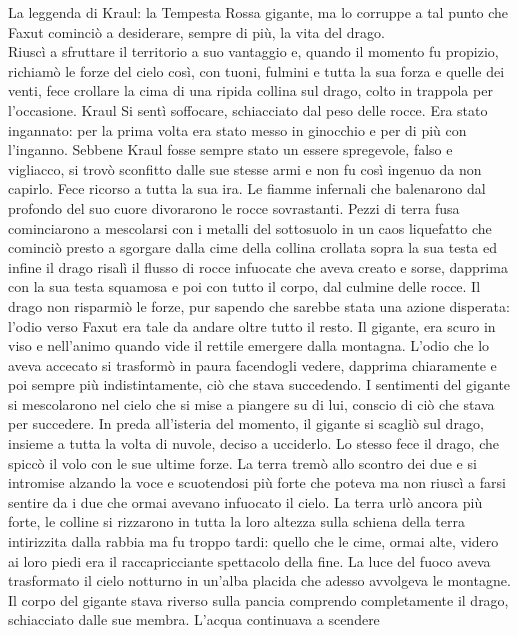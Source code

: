 \documentclass[10pt,twoside,twocolumn]{article}
\begin{document}
\begin{commentbox}{La leggenda di Kraul: la Tempesta Rossa}
  gigante, ma lo corruppe a tal punto che Faxut cominci\`o a desiderare,
  sempre di pi\`u, la vita del drago.\\
  Riusc\`i a sfruttare il territorio a suo vantaggio e, quando il momento fu propizio,
  richiam\`o le forze del cielo cos\`i, con tuoni, fulmini e tutta la sua forza e quelle dei venti,
  fece crollare la cima di una ripida collina sul drago, colto in trappola per l'occasione.
  Kraul Si sent\`i soffocare, schiacciato dal peso delle rocce. Era stato ingannato:
  per la prima volta era stato messo in ginocchio e per di pi\`u con l'inganno.
  Sebbene Kraul fosse sempre stato un essere spregevole, falso e vigliacco,
  si trov\`o sconfitto dalle sue stesse armi e non fu cos\`i ingenuo da non capirlo.
  Fece ricorso a tutta la sua ira.
  Le fiamme infernali che balenarono dal profondo del suo cuore divorarono le
  rocce sovrastanti. Pezzi di terra fusa cominciarono a mescolarsi con i metalli del
  sottosuolo in un caos liquefatto che cominci\`o presto a sgorgare dalla cime della collina
  crollata sopra la sua testa ed infine  il drago risal\`i il flusso di rocce infuocate
  che aveva creato e sorse, dapprima con la sua testa squamosa e poi con tutto il corpo,
  dal culmine delle rocce. Il drago non risparmi\`o le forze, pur sapendo
  che sarebbe stata una azione disperata: l'odio verso Faxut era tale da andare oltre
  tutto il resto. Il gigante, era scuro in viso e nell'animo quando vide il rettile
  emergere dalla montagna. L'odio che lo aveva accecato si trasform\`o in paura facendogli
  vedere, dapprima chiaramente e poi sempre pi\`u indistintamente, ci\`o che stava succedendo.
  I sentimenti del gigante si mescolarono nel cielo che si mise a piangere su di lui,
  conscio di ci\`o che stava per succedere. In preda all'isteria del momento, il gigante
  si scagli\`o sul drago, insieme a tutta la volta di nuvole, deciso a ucciderlo. Lo stesso
  fece il drago, che spicc\`o il volo con le sue ultime forze. La terra trem\`o allo scontro
  dei due e si intromise alzando la voce e scuotendosi pi\`u forte che poteva ma
  non riusc\`i a farsi sentire da i due che ormai avevano infuocato il cielo.
  La terra url\`o ancora pi\`u forte, le colline si rizzarono in tutta la loro altezza sulla
  schiena della terra intirizzita dalla rabbia  ma fu troppo tardi:
  quello che le cime, ormai alte, videro ai loro piedi era il
  raccapricciante spettacolo della fine. La luce del fuoco aveva trasformato il cielo notturno
  in un'alba placida che adesso avvolgeva le montagne. Il corpo del gigante stava riverso sulla pancia
  comprendo completamente il drago, schiacciato dalle sue membra. L'acqua continuava a scendere

\end{commentbox}
\end{document}

